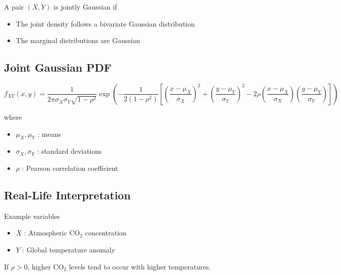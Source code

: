 \documentclass[11pt]{article}
\begin{document}
A pair $(X,Y)$ is jointly Gaussian if

\begin{itemize}
\item The joint density follows a bivariate Gaussian distribution
\item The marginal distributions are Gaussian
\end{itemize}

\subsection*{Joint Gaussian PDF}

\[
f_{XY}(x,y)=
\frac{1}{2\pi\sigma_X\sigma_Y\sqrt{1-\rho^2}}
\exp
\left(
-\frac{1}{2(1-\rho^2)}
\left[
\left(\frac{x-\mu_X}{\sigma_X}\right)^2
+
\left(\frac{y-\mu_Y}{\sigma_Y}\right)^2
-
2\rho
\left(\frac{x-\mu_X}{\sigma_X}\right)
\left(\frac{y-\mu_Y}{\sigma_Y}\right)
\right]
\right)
\]

where

\begin{itemize}
\item $\mu_X,\mu_Y$ : means
\item $\sigma_X,\sigma_Y$ : standard deviations
\item $\rho$ : Pearson correlation coefficient
\end{itemize}

\subsection*{Real-Life Interpretation}

Example variables

\begin{itemize}
\item $X$ : Atmospheric CO$_2$ concentration
\item $Y$ : Global temperature anomaly
\end{itemize}

If $\rho > 0$, higher CO$_2$ levels tend to occur with higher temperatures.
\end{document}
